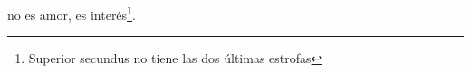 no es amor, es interés\footnote{\textsuperscript{}Superior secundus no tiene las dos últimas estrofas}.
